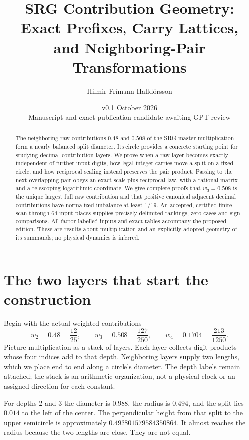 \documentclass[11pt,a4paper]{article}
\title{\Large SRG Contribution Geometry:\\Exact Prefixes, Carry Lattices,\\and Neighboring-Pair Transformations}
\author{Hilmir Frímann Halldórsson}
\date{v0.1 \quad 13 October 2026\\\small Manuscript and exact publication candidate awaiting GPT review}
\begin{document}
\maketitle
\begin{abstract}
The neighboring raw contributions $0.48$ and $0.508$ of the SRG master multiplication form a nearly balanced split diameter. Its circle provides a concrete starting point for studying decimal contribution layers. We prove when a raw layer becomes exactly independent of further input digits, how legal integer carries move a split on a fixed circle, and how reciprocal scaling instead preserves the pair product. Passing to the next overlapping pair obeys an exact scale-plus-reciprocal law, with a rational matrix and a telescoping logarithmic coordinate. We give complete proofs that $w_3=0.508$ is the unique largest full raw contribution and that positive canonical adjacent decimal contributions have normalized imbalance at least $1/19$. An accepted, certified finite scan through 64 input places supplies precisely delimited rankings, zero cases and sign comparisons. All factor-labelled inputs and exact tables accompany the proposed edition. These are results about multiplication and an explicitly adopted geometry of its summands; no physical dynamics is inferred.
\end{abstract}

\section{The two layers that start the construction}
\label{sec:start}
Begin with the actual weighted contributions
\begin{equation}
w_2=0.48=\frac{12}{25},\qquad
w_3=0.508=\frac{127}{250},\qquad
w_4=0.1704=\frac{213}{1250}.
\label{eq:threeweights}
\end{equation}
Picture multiplication as a stack of layers. Each layer collects digit products whose four indices add to that depth. Neighboring layers supply two lengths, which we place end to end along a circle's diameter. The depth labels remain attached; the stack is an arithmetic organization, not a physical clock or an assigned direction for each constant.

For depths 2 and 3 the diameter is $0.988$, the radius is $0.494$, and the split lies $0.014$ to the left of the center. The perpendicular height from that split to the upper semicircle is approximately $0.493801579584350864$. It almost reaches the radius because the two lengths are close. They are not equal.
\end{document}
